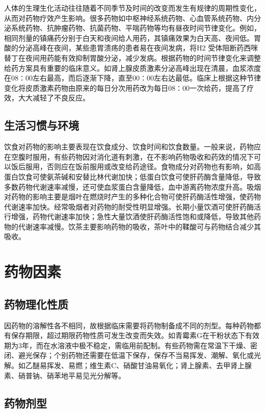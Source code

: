 人体的生理生化活动往往随着不同季节及时间的改变而发生有规律的周期性变化，从而对药物疗效产生影响。很多药物如中枢神经系统药物、心血管系统药物、内分泌系统药物、抗肿瘤药物、抗菌药物、平喘药物等均有昼夜时间节律变化。例如，相同剂量的镇痛药分别于白天和夜间给人用药，其镇痛效果为白天高、夜间低。胃酸的分泌高峰在夜间，某些患胃溃疡的患者易在夜间发病，将H{2}
受体阻断药西咪替丁在夜间用药能有效抑制胃酸分泌，减少发病。根据药物的时间节律变化来调整给药方案具有重要的临床意义。如肾上腺皮质激素分泌高峰出现在清晨，血浆浓度在08∶00左右最高，而后逐渐下降，直至00∶00左右达最低。临床上根据这种节律变化将皮质激素药物由原来的每日分次用药改为每日08∶00一次给药，提高了疗效，大大减轻了不良反应。

\subsection{生活习惯与环境}

饮食对药物的影响主要表现在饮食成分、饮食时间和饮食数量。一般来说，药物应在空腹时服用，有些药物因对消化道有刺激，在不影响药物吸收和药效的情况下可以饭后服用，否则应在饭前服用或改变给药途径。食物成分对药物也有影响，如高蛋白饮食可使氨茶碱和安替比林代谢加快；低蛋白饮食可使肝药酶含量降低，导致多数药物代谢速率减慢，还可使血浆蛋白含量降低，血中游离药物浓度升高。吸烟对药物的影响主要是烟叶在燃烧时产生的多种化合物可使肝药酶活性增强，使药物代谢速率加快。经常吸烟者对药物的耐受性明显增强。长期小量饮酒可使肝药酶活行增强，药物代谢速率加快；急性大量饮酒使肝药酶活性饱和或降低，导致其他药物的代谢速率减慢。饮茶主要影响药物的吸收，茶叶中的鞣酸可与药物结合减少其吸收。

\section{药物因素}

\subsection{药物理化性质}

因药物的溶解性各不相同，故根据临床需要将药物制备成不同的剂型。每种药物都有保存期限，超过期限药物性质可发生改变而失效。如青霉素G在干粉状态下有效期为3年，而在水溶液中极不稳定，需临用前配制。有些药物需在常温下干燥、密闭、避光保存；个别药物还需要在低温下保存，保存不当易挥发、潮解、氧化或光解。如乙醚易挥发、易燃；维生素C、硝酸甘油易氧化；肾上腺素、去甲肾上腺素、硝普钠、硝苯地平易见光分解等。

\subsection{药物剂型}

